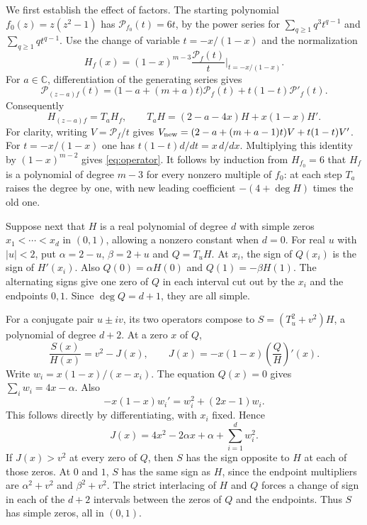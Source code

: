 \documentclass[11pt]{article}
\newcommand{\CC}{\mathbb C}
\newcommand{\PP}{\mathcal P}
\begin{document}
We first establish the effect of factors. The starting polynomial
$f_0(z)=z(z^2-1)$ has $\PP_{f_0}(t)=6t$, by the power series for
$\sum_{q\ge1}q^3t^{q-1}$ and $\sum_{q\ge1}qt^{q-1}$. Use the change
of variable $t=-x/(1-x)$ and the normalization
\[
H_f(x)=(1-x)^{m-3}\frac{\PP_f(t)}{t}\bigg|_{t=-x/(1-x)}.
\]
For $a\in\CC$, differentiation of the generating series gives
\[
\PP_{(z-a)f}(t)
  =\bigl(1-a+(m+a)t\bigr)\PP_f(t)
      +t(1-t)\PP'_f(t).
\]
Consequently
\begin{equation}\label{eq:operator}
H_{(z-a)f}=T_a H_f,\qquad
T_a H=(2-a-4x)H+x(1-x)H'.
\end{equation}
For clarity, writing $V=\PP_f/t$ gives
$V_{\rm new}=(2-a+(m+a-1)t)V+t(1-t)V'$.
For $t=-x/(1-x)$ one has $t(1-t)d/dt=x\,d/dx$.
Multiplying this identity by $(1-x)^{m-2}$ gives
\eqref{eq:operator}. It follows by induction from $H_{f_0}=6$ that
$H_f$ is a polynomial of degree $m-3$ for every nonzero multiple of
$f_0$: at each step $T_a$ raises the degree by one, with new leading
coefficient $-(4+\deg H)$ times the old one.

Suppose next that $H$ is a real polynomial of degree $d$ with simple
zeros $x_1<\cdots<x_d$ in $(0,1)$, allowing a nonzero constant when
$d=0$. For real $u$ with $|u|<2$, put $\alpha=2-u$, $\beta=2+u$ and
$Q=T_uH$. At $x_i$, the sign of $Q(x_i)$ is the sign of $H'(x_i)$.
Also $Q(0)=\alpha H(0)$ and $Q(1)=-\beta H(1)$. The alternating
signs give one zero of $Q$ in each interval cut out by the $x_i$ and
the endpoints $0,1$. Since $\deg Q=d+1$, they are all simple.

For a conjugate pair $u\pm iv$, its two operators compose to
$S=(T_u^2+v^2)H$, a polynomial of degree $d+2$. At a zero $x$ of $Q$,
\[
\frac{S(x)}{H(x)}=v^2-J(x),\qquad
J(x)=-x(1-x)\left(\frac{Q}{H}\right)'(x).
\]
Write $w_i=x(1-x)/(x-x_i)$. The equation $Q(x)=0$ gives
$\sum_i w_i=4x-\alpha$. Also
\[
-x(1-x)w_i'=w_i^2+(2x-1)w_i.
\]
This follows directly by differentiating, with $x_i$ fixed. Hence
\begin{equation}\label{eq:margin}
J(x)=4x^2-2\alpha x+\alpha+\sum_{i=1}^{d}w_i^2.
\end{equation}
If $J(x)>v^2$ at every zero of $Q$, then $S$ has the sign opposite
to $H$ at each of those zeros. At $0$ and $1$, $S$ has the same sign
as $H$, since the endpoint multipliers are $\alpha^2+v^2$ and
$\beta^2+v^2$. The strict interlacing of $H$ and $Q$ forces a change
of sign in each of the $d+2$ intervals between the zeros of $Q$ and
the endpoints. Thus $S$ has simple zeros, all in $(0,1)$.
\end{document}
